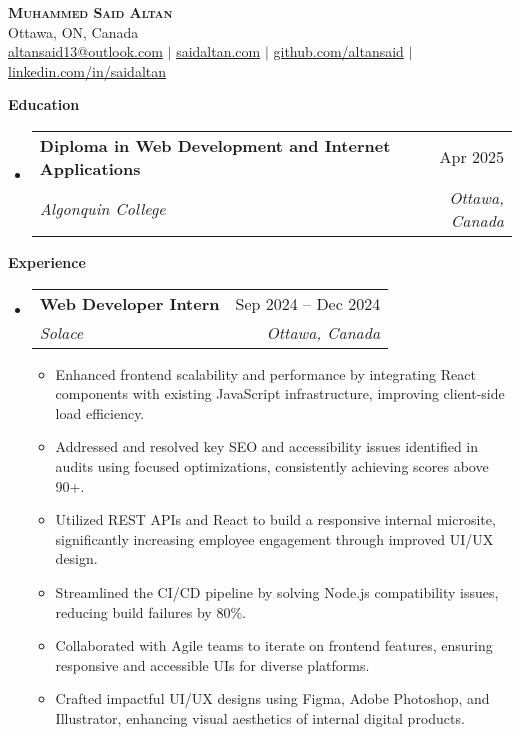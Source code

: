 \documentclass[letterpaper, 10pt]{article}
\makeatletter
\newcommand{\resumeItem}[1]{
  \item\small{
    {#1 \vspace{-2pt}}
  }
}
\newcommand{\resumeSubheading}[4]{
  \vspace{-1pt}\item
    \begin{tabular*}{0.97\textwidth}[t]{l@{\extracolsep{\fill}}r}
      \textbf{#1} & #2 \\
      \textit{\small#3} & \textit{\small #4} \\
    \end{tabular*}\vspace{-5pt}
}
\newcommand{\resumeSubHeadingListStart}{\begin{itemize}[leftmargin=0.15in, label={}]}
\newcommand{\resumeSubHeadingListEnd}{\end{itemize}}
\newcommand{\section}[1]{
  \vspace{4pt}\textsc{\large} \textbf{#1}
  \vspace{2pt}
}
\newcommand{\resumeItemListStart}{\begin{itemize}}
\newcommand{\resumeItemListEnd}{\end{itemize}\vspace{-5pt}}
\makeatother
\begin{document}
\begin{center}
    \textbf{\Huge {\scshape Muhammed Said Altan}} \\ \vspace{1pt}
    Ottawa, ON, Canada \\ \vspace{1pt}
    \href{mailto:altansaid13@outlook.com}{altansaid13@outlook.com} $ | $
    \href{https://saidaltan.com}{saidaltan.com} $ | $
    \href{https://github.com/altansaid}{github.com/altansaid} $ | $
    \href{https://linkedin.com/in/saidaltan}{linkedin.com/in/saidaltan}
\end{center}

\section{Education}
  \resumeSubHeadingListStart
    \resumeSubheading
      {Diploma in Web Development and Internet Applications}{Apr 2025}
      {Algonquin College}{Ottawa, Canada}
  \resumeSubHeadingListEnd

\section{Experience}
  \resumeSubHeadingListStart
    \resumeSubheading
      {Web Developer Intern}{Sep 2024 -- Dec 2024}
      {Solace}{Ottawa, Canada}
      \resumeItemListStart
        \resumeItem{Enhanced frontend scalability and performance by integrating React components with existing JavaScript infrastructure, improving client-side load efficiency.}
        \resumeItem{Addressed and resolved key SEO and accessibility issues identified in audits using focused optimizations, consistently achieving scores above 90+.}
        \resumeItem{Utilized REST APIs and React to build a responsive internal microsite, significantly increasing employee engagement through improved UI/UX design.}
        \resumeItem{Streamlined the CI/CD pipeline by solving Node.js compatibility issues, reducing build failures by 80\%.}
        \resumeItem{Collaborated with Agile teams to iterate on frontend features, ensuring responsive and accessible UIs for diverse platforms.}
        \resumeItem{Crafted impactful UI/UX designs using Figma, Adobe Photoshop, and Illustrator, enhancing visual aesthetics of internal digital products.}
      \resumeItemListEnd
  \resumeSubHeadingListEnd
\end{document}
